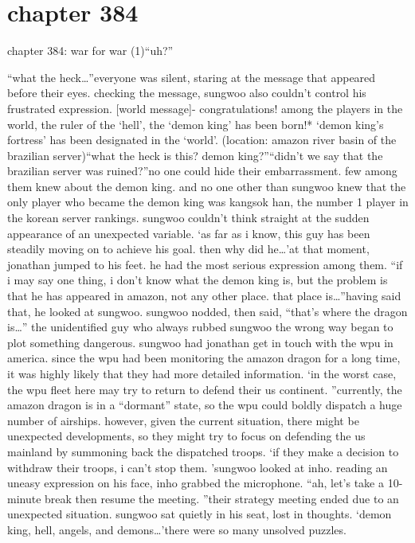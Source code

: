 \section{chapter 384}

chapter 384: war for war (1)“uh?”




“what the heck…”everyone was silent, staring at the message that appeared before their eyes.
checking the message, sungwoo also couldn’t control his frustrated expression.
[world message]- congratulations! among the players in the world, the ruler of the ‘hell’, the ‘demon king’ has been born!* ‘demon king’s fortress’ has been designated in the ‘world’.
 (location: amazon river basin of the brazilian server)“what the heck is this? demon king?”“didn’t we say that the brazilian server was ruined?”no one could hide their embarrassment.
 few among them knew about the demon king.
and no one other than sungwoo knew that the only player who became the demon king was kangsok han, the number 1 player in the korean server rankings.
 sungwoo couldn’t think straight at the sudden appearance of an unexpected variable.
‘as far as i know, this guy has been steadily moving on to achieve his goal.
 then why did he…’at that moment, jonathan jumped to his feet.
 he had the most serious expression among them.
“if i may say one thing, i don’t know what the demon king is, but the problem is that he has appeared in amazon, not any other place.
 that place is…”having said that, he looked at sungwoo.
sungwoo nodded, then said, “that’s where the dragon is…”
the unidentified guy who always rubbed sungwoo the wrong way began to plot something dangerous.
sungwoo had jonathan get in touch with the wpu in america.
since the wpu had been monitoring the amazon dragon for a long time, it was highly likely that they had more detailed information.
‘in the worst case, the wpu fleet here may try to return to defend their us continent.
”currently, the amazon dragon is in a “dormant” state, so the wpu could boldly dispatch a huge number of airships.
 however, given the current situation, there might be unexpected developments, so they might try to focus on defending the us mainland by summoning back the dispatched troops.
‘if they make a decision to withdraw their troops, i can’t stop them.
’sungwoo looked at inho.
reading an uneasy expression on his face, inho grabbed the microphone.
“ah, let’s take a 10-minute break then resume the meeting.
”their strategy meeting ended due to an unexpected situation.
sungwoo sat quietly in his seat, lost in thoughts.
‘demon king, hell, angels, and demons…’there were so many unsolved puzzles.
